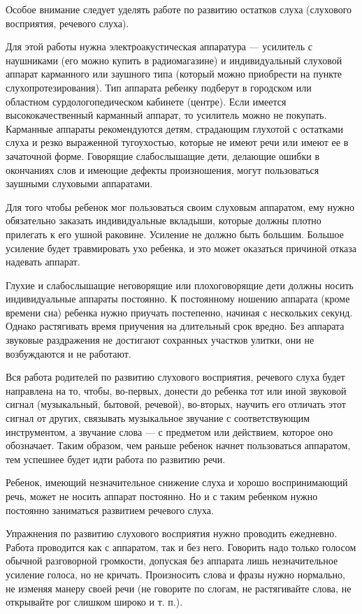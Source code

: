 \documentclass{book}
\begin{document}
Особое внимание следует уделять работе по развитию остатков слуха
(слухового восприятия, речевого слуха).

Для этой работы нужна электроакустическая аппаратура --- усилитель с
наушниками (его можно купить в радиомагазине) и индивидуальный слуховой
аппарат карманного или заушного типа (который можно приобрести на пункте
слухопротезирования). Тип аппарата ребенку подберут в городском или
областном сурдологопедическом кабинете (центре). Если имеется
высококачественный карманный аппарат, то усилитель можно не покупать.
Карманные аппараты рекомендуются детям, страдающим глухотой с остатками
слуха и резко выраженной тугоухостью, которые не имеют речи или имеют ее
в зачаточной форме. Говорящие слабослышащие дети, делающие ошибки в
окончаниях слов и имеющие дефекты произношения, могут пользоваться
заушными слуховыми аппаратами.

Для того чтобы ребенок мог пользоваться своим слуховым аппаратом, ему
нужно обязательно заказать индивидуальные вкладыши, которые должны
плотно прилегать к его ушной раковине. Усиление не должно быть большим.
Большое усиление будет травмировать ухо ребенка, и это может оказаться
причиной отказа надевать аппарат.

Глухие и слабослышащие неговорящие или плохоговорящие дети должны носить
индивидуальные аппараты постоянно. К постоянному ношению аппарата (кроме
времени сна) ребенка нужно приучать постепенно, начиная с нескольких
секунд. Однако растягивать время приучения на длительный срок вредно.
Без аппарата звуковые раздражения не достигают сохранных участков
улитки, они не возбуждаются и не работают.

Вся работа родителей по развитию слухового восприятия, речевого слуха
будет направлена на то, чтобы, во-первых, донести до ребенка тот или
иной звуковой сигнал (музыкальный, бытовой, речевой), во-вторых, научить
его отличать этот сигнал от других, связывать музыкальное звучание с
соответствующим инструментом, а звучание слова --- с предметом или
действием, которое оно обозначает. Таким образом, чем раньше ребенок
начнет пользоваться аппаратом, тем успешнее будет идти работа по
развитию речи.

Ребенок, имеющий незначительное снижение слуха и хорошо воспринимающий
речь, может не носить аппарат постоянно. Но и с таким ребенком нужно
постоянно заниматься развитием речевого слуха.

Упражнения по развитию слухового восприятия нужно проводить ежедневно.
Работа проводится как с аппаратом, так и без него. Говорить надо только
голосом обычной разговорной громкости, допуская без аппарата лишь
незначительное усиление голоса, но не кричать. Произносить слова и фразы
нужно нормально, не изменяя манеру своей речи (не говорите по слогам, не
растягивайте слова, не открывайте рог слишком широко и т. п.).
\end{document}
